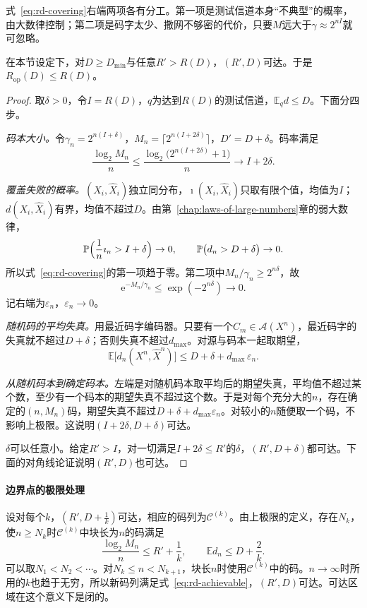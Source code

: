 式~\eqref{eq:rd-covering}右端两项各有分工。第一项是测试信道本身“不典型”的概率，由大数律控制；第二项是码字太少、撒网不够密的代价，只要$M$远大于$\gamma\approx2^{nI}$就可忽略。

\begin{theorem}[可达性]
\label{thm:rd-achievability}
在本节设定下，对$D\geq D_{\min}$与任意$R'>R(D)$，$(R',D)$可达。于是$R_{\mathrm{op}}(D)\leq R(D)$。
\end{theorem}

\begin{proof}
取$\delta>0$，令$I=R(D)$，$q$为达到$R(D)$的测试信道，$\mathbb{E}_qd\leq D$。下面分四步。

\emph{码本大小。}令$\gamma_n=2^{n(I+\delta)}$，$M_n=\lceil2^{n(I+2\delta)}\rceil$，$D'=D+\delta$。码率满足
\[
  \frac{\log_2M_n}{n}\leq\frac{\log_2\bigl(2^{n(I+2\delta)}+1\bigr)}{n}\to I+2\delta .
\]

\emph{覆盖失败的概率。}$(X_i,\hat{X}_i)$独立同分布，$\imath(X_i,\hat{X}_i)$只取有限个值，均值为$I$；$d(X_i,\hat{X}_i)$有界，均值不超过$D$。由第~\ref{chap:laws-of-large-numbers}章的弱大数律，
\[
  \mathbb{P}\Bigl(\frac1n\imath_n>I+\delta\Bigr)\to0,\qquad \mathbb{P}\bigl(d_n>D+\delta\bigr)\to0 .
\]
所以式~\eqref{eq:rd-covering}的第一项趋于零。第二项中$M_n/\gamma_n\geq2^{n\delta}$，故
\[
  \mathrm{e}^{-M_n/\gamma_n}\leq\exp(-2^{n\delta})\to0 .
\]记右端为$\varepsilon_n$，$\varepsilon_n\to0$。

\emph{随机码的平均失真。}用最近码字编码器。只要有一个$C_m\in\mathcal{A}(X^{n})$，最近码字的失真就不超过$D+\delta$；否则失真不超过$d_{\max}$。对源与码本一起取期望，
\[
  \mathbb{E}\bigl[d_n(X^{n},\hat{X}^{n})\bigr]\leq D+\delta+d_{\max}\,\varepsilon_n .
\]

\emph{从随机码本到确定码本。}左端是对随机码本取平均后的期望失真，平均值不超过某个数，至少有一个码本的期望失真不超过这个数。于是对每个充分大的$n$，存在确定的$(n,M_n)$码，期望失真不超过$D+\delta+d_{\max}\varepsilon_n$。对较小的$n$随便取一个码，不影响上极限。这说明$(I+2\delta,D+\delta)$可达。

$\delta$可以任意小。给定$R'>I$，对一切满足$I+2\delta\leq R'$的$\delta$，$(R',D+\delta)$都可达。下面的对角线论证说明$(R',D)$也可达。
\end{proof}

\paragraph{边界点的极限处理}
设对每个$k$，$(R',D+\tfrac1k)$可达，相应的码列为$\mathcal{C}^{(k)}$。由上极限的定义，存在$N_k$，使$n\geq N_k$时$\mathcal{C}^{(k)}$中块长为$n$的码满足
\[
  \frac{\log_2M_n}{n}\leq R'+\frac1k,\qquad \mathbb{E}d_n\leq D+\frac2k .
\]
可以取$N_1<N_2<\cdots$。对$N_k\leq n<N_{k+1}$，块长$n$时使用$\mathcal{C}^{(k)}$中的码。$n\to\infty$时所用的$k$也趋于无穷，所以新码列满足式~\eqref{eq:rd-achievable}，$(R',D)$可达。可达区域在这个意义下是闭的。

